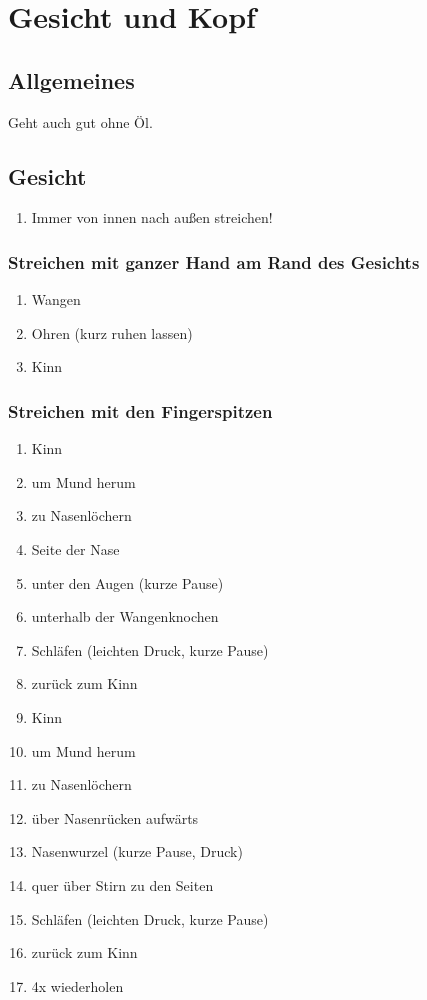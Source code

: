 \section{Gesicht und Kopf}
\subsection{Allgemeines}
Geht auch gut ohne Öl.

\subsection{Gesicht}
\begin{enumerate}
\item Immer von innen nach außen streichen!
\end{enumerate}


\subsubsection{Streichen mit ganzer Hand am Rand des Gesichts}
\begin{enumerate}
\item Wangen
\item Ohren (kurz ruhen lassen)
\item Kinn
\end{enumerate}

\subsubsection{Streichen mit den Fingerspitzen}
\begin{enumerate}
\item Kinn
\item um Mund herum
\item zu Nasenlöchern
\item Seite der Nase
\item unter den Augen (kurze Pause)
\item unterhalb der Wangenknochen
\item Schläfen (leichten Druck, kurze Pause)
\item zurück zum Kinn
\item Kinn 
\item um Mund herum 
\item zu Nasenlöchern
\item über Nasenrücken aufwärts
\item Nasenwurzel (kurze Pause, Druck)
\item quer über Stirn zu den Seiten
\item Schläfen (leichten Druck, kurze Pause)
\item zurück zum Kinn
\item 4x wiederholen
\end{enumerate}

